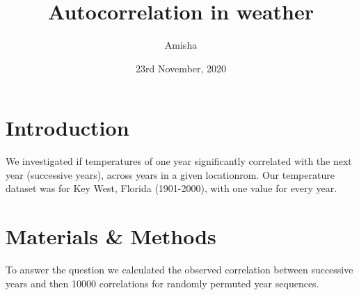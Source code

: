 \documentclass[12pt]{article}
\title{Autocorrelation in weather}
\author{Amisha}
\date{23rd November, 2020}
\begin{document}
  \maketitle

  \section{Introduction}
    We investigated if temperatures of one year significantly correlated with the next year (successive years), across years in a given locationrom. Our temperature dataset was for Key West, Florida (1901-2000), with one value for every year.
  
  \section{Materials \& Methods}
  To answer the question we calculated the observed correlation between successive years and then 10000 correlations for randomly permuted year sequences.
  
\end{document}
